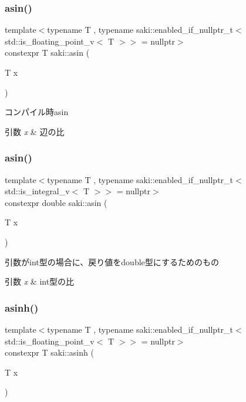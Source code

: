 \subsubsection{\texorpdfstring{asin()}{asin()}\hspace{0.1cm}{\footnotesize\ttfamily [1/2]}}
{\footnotesize\ttfamily template$<$typename T , typename saki\+::enabled\+\_\+if\+\_\+nullptr\+\_\+t$<$ std\+::is\+\_\+floating\+\_\+point\+\_\+v$<$ T $>$$>$  = nullptr$>$ \\
constexpr T saki\+::asin (\begin{DoxyParamCaption}\item[{T}]{x }\end{DoxyParamCaption})}



コンパイル時asin 


\begin{DoxyParams}{引数}
{\em x} & 辺の比 \\
\hline
\end{DoxyParams}
\mbox{\label{namespacesaki_aac285debedd1f53761a838c0e4f57af0}} 
\subsubsection{\texorpdfstring{asin()}{asin()}\hspace{0.1cm}{\footnotesize\ttfamily [2/2]}}
{\footnotesize\ttfamily template$<$typename T , typename saki\+::enabled\+\_\+if\+\_\+nullptr\+\_\+t$<$ std\+::is\+\_\+integral\+\_\+v$<$ T $>$$>$  = nullptr$>$ \\
constexpr double saki\+::asin (\begin{DoxyParamCaption}\item[{T}]{x }\end{DoxyParamCaption})}



引数がint型の場合に、戻り値をdouble型にするためのもの 


\begin{DoxyParams}{引数}
{\em x} & int型の比 \\
\hline
\end{DoxyParams}
\mbox{\label{namespacesaki_ab097a2d600f313b6bdd3099e61a10b9e}} 
\subsubsection{\texorpdfstring{asinh()}{asinh()}\hspace{0.1cm}{\footnotesize\ttfamily [1/2]}}
{\footnotesize\ttfamily template$<$typename T , typename saki\+::enabled\+\_\+if\+\_\+nullptr\+\_\+t$<$ std\+::is\+\_\+floating\+\_\+point\+\_\+v$<$ T $>$$>$  = nullptr$>$ \\
constexpr T saki\+::asinh (\begin{DoxyParamCaption}\item[{T}]{x }\end{DoxyParamCaption})}



